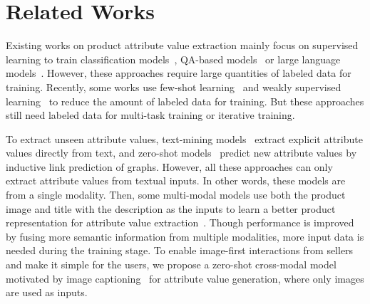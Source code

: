 \section{Related Works}
Existing works on product attribute value extraction mainly focus on supervised learning to train classification models~\cite{10386204, chen2022extreme, 10020304}, QA-based models~\cite{chen-etal-2023-named, liu2023knowledge, shinzato2022simple, wang2020learning} or large language models~\cite{fang2024llm, brinkmann2023product, baumann2024using}. 
However, these approaches require large quantities of labeled data for training.
Recently, some works use few-shot learning~\cite{10.1145/3583780.3615142, yang2023mixpave} and weakly supervised learning~\cite{xu2023towards, zhang2022oa} to reduce the amount of labeled data for training. 
But these approaches still need labeled data for multi-task training or iterative training.

To extract unseen attribute values, text-mining models~\cite{li2023attgen, xu2023towards} extract explicit attribute values directly from text, and zero-shot models~\cite{hu2025hypergraphbased, gong2024multi} predict new attribute values by inductive link prediction of graphs.
However, all these approaches can only extract attribute values from textual inputs. 
In other words, these models are from a single modality. 
Then, some multi-modal models use both the product image and title with the description as the inputs to learn a better product representation for attribute value extraction~\cite{zou2024implicitave, zou2024eiven, liu2023multimodal, wang2023mpkgac, ghosh2023d, wang2022smartave, liu2022boosting}.
Though performance is improved by fusing more semantic information from multiple modalities, more input data is needed during the training stage. 
To enable image-first interactions from sellers and make it simple for the users, we propose a zero-shot cross-modal model motivated by image captioning~\cite{fei2023transferable, guo2023images, xu2023zero, zeng2023conzic, tewel2022zerocap} for attribute value generation, where only images are used as inputs.